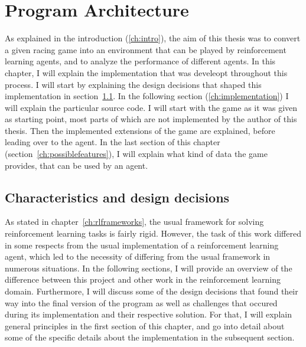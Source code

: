 \chapter{Program Architecture}

\label{ch:program}

\newcommand{\term}[1] {{\spaceskip=.95\fontdimen2\font minus \fontdimen4\font
	\xspaceskip=0pt\relax \large\texttt{#1}}}

As explained in the introduction (\ref{ch:intro}), the aim of this thesis was to convert a given racing game into an environment that can be played by reinforcement learning agents, and to analyze the performance of different agents. In this chapter, I will explain the implementation that was develeopt throughout this process. I will start by explaining the design decisions that shaped this implementation in section~\ref{ch:projectcharacteristicschap}. In the following section (\ref{ch:implementation}) I will explain the particular source code. I will start with the game as it was given as starting point, most parts of which are not implemented by the author of this thesis. Then the implemented extensions of the game are explained, before leading over to the agent. In the last section of this chapter (section~\ref{ch:possiblefeatures}), I will explain what kind of data the game provides, that can be used by an agent.

\section{Characteristics and design decisions}

\label{ch:projectcharacteristicschap}

As stated in chapter~\ref{ch:rlframeworks}, the usual framework for solving reinforcement learning tasks is fairly rigid. However, the task of this work differed in some respects from the usual implementation of a reinforcement learning agent, which led to the necessity of differing from the usual framework in numerous situations. In the following sections, I will provide an overview of the difference between this project and other work in the reinforcement learning domain. Furthermore, I will discuss some of the design decisions that found their way into the final version of the program as well as challenges that occured during its implementation and their respective solution. For that, I will explain general principles in the first section of this chapter, and go into detail about some of the specific details about the implementation in the subsequent section.

